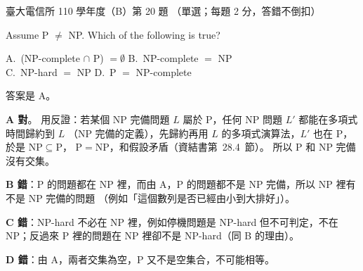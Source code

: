 \begin{pastexam}[label={px:ntu-110-comm-dsa-20}]{臺大電信所 110 學年度（B）第 20 題}
（單選；每題 2 分，答錯不倒扣）

Assume P $\neq$ NP. Which of the following is true?

A.~(NP-complete $\cap$ P) $=\emptyset$ \qquad B.~NP-complete $=$ NP\\
C.~NP-hard $=$ NP \qquad D.~P $=$ NP-complete
\end{pastexam}

\begin{pastsoln}
答案是 A。

\textbf{A 對}。 用反證：若某個 NP 完備問題 $L$ 屬於 P，任何 NP 問題 $L'$ 都能在多項式時間歸約到 $L$
（NP 完備的定義），先歸約再用 $L$ 的多項式演算法，$L'$ 也在 P，於是 $\mathrm{NP} \subseteq \mathrm{P}$，
$\mathrm{P} = \mathrm{NP}$，和假設矛盾（資結書第~28.4~節）。 所以 P 和 NP 完備沒有交集。

\textbf{B 錯}：P 的問題都在 NP 裡，而由 A，P 的問題都不是 NP 完備，所以 NP 裡有不是 NP 完備的問題
（例如「這個數列是否已經由小到大排好」）。

\textbf{C 錯}：NP-hard 不必在 NP 裡，例如停機問題是 NP-hard 但不可判定，不在 NP；反過來 P 裡的問題在 NP
裡卻不是 NP-hard（同 B 的理由）。

\textbf{D 錯}：由 A，兩者交集為空，P 又不是空集合，不可能相等。
\end{pastsoln}
